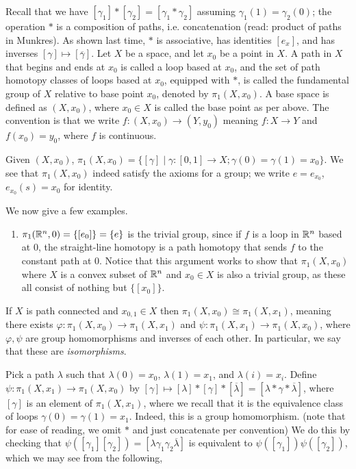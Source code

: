 \noindent Recall that we have $[\gamma_1] \ast [\gamma_2] = [\gamma_1 \ast \gamma_2]$ assuming $\gamma_1(1) = \gamma_2(0)$; the operation $\ast$ is a composition of paths, i.e. concatenation (read: product of paths in Munkres). As shown last time, $\ast$ is associative, has identities $[e_x]$, and has inverses $[\gamma] \mapsto [\overline{\gamma}]$. 
\medskip\newline
Let $X$ be a space, and let $x_0$ be a point in $X$. A path in $X$ that begins and ends at $x_0$ is called a loop based at $x_0$, and the set of path homotopy classes of loops based at $x_0$, equipped with $\ast$, is called the fundamental group of $X$ relative to base point $x_0$, denoted by $\pi_1(X, x_0)$.
\medskip\newline
A base space is defined as $(X, x_0)$, where $x_0 \in X$ is called the base point as per above. The convention is that we write $f : (X, x_0) \to (Y, y_0)$ meaning $f : X \to Y$ and $f(x_0) = y_0$, where $f$ is continuous.
\begin{definition}
    Given $(X, x_0)$, $\pi_1(X, x_0) = \{ [\gamma] \mid \gamma : [0, 1] \to X; \gamma(0) = \gamma(1) = x_0 \}$. We see that $\pi_1(X, x_0)$ indeed satisfy the axioms for a group; we write $e = e_{x_0}$, $e_{x_0}(s) = x_0$ for identity.
\end{definition}
\noindent We now give a few examples.
\begin{enumerate}[label=(\alph*)]
    \item $\pi_1(\mathbb R^n, 0) = \{[e_0]\} = \{e\}$ is the trivial group, since if $f$ is a loop in $\mathbb R^n$ based at $0$, the straight-line homotopy is a path homotopy that sends $f$ to the constant path at $0$. Notice that this argument works to show that $\pi_1(X, x_0)$ where $X$ is a convex subset of $\mathbb R^n$ and $x_0 \in X$ is also a trivial group, as these all consist of nothing but $\{[x_0]\}$.
\end{enumerate}
\begin{simplethm}
    If $X$ is path connected and $x_{0, 1} \in X$ then $\pi_1(X, x_0) \cong \pi_1(X, x_1)$, meaning there exists $\varphi : \pi_1(X, x_0) \to \pi_1(X, x_1)$ and $\psi : \pi_1(X, x_1) \to \pi_1(X, x_0)$, where $\varphi, \psi$ are group homomorphisms and inverses of each other. In particular, we say that these are \textit{isomorphisms}.
\end{simplethm}
\noindent Pick a path $\lambda$ such that $\lambda(0) = x_0$, $\lambda(1) = x_1$, and $\lambda(i) = x_i$. Define $\psi : \pi_1(X, x_1) \to \pi_1(X, x_0)$ by $[\gamma] \mapsto [\lambda] \ast [\gamma] \ast [\overline{\lambda}] = [\lambda \ast \gamma \ast \overline{\lambda}]$, where $[\gamma]$ is an element of $\pi_1(X, x_1)$, where we recall that it is the equivalence class of loops $\gamma(0) = \gamma(1) = x_1$. Indeed, this is a group homomorphism. (note that for ease of reading, we omit $\ast$ and just concatenate per convention) We do this by checking that $\psi([\gamma_1][\gamma_2]) = [\lambda \gamma_1 \gamma_2 \overline{\lambda}]$ is equivalent to $\psi([\gamma_1]) \psi([\gamma_2])$, which we may see from the following,
